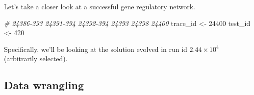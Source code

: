 \documentclass[
]{book}
\newenvironment{Shaded}{\begin{snugshade}}{\end{snugshade}}
\newcommand{\CommentTok}[1]{\textcolor[rgb]{0.56,0.35,0.01}{\textit{#1}}}
\newcommand{\DecValTok}[1]{\textcolor[rgb]{0.00,0.00,0.81}{#1}}
\newcommand{\NormalTok}[1]{#1}
\newcommand{\OtherTok}[1]{\textcolor[rgb]{0.56,0.35,0.01}{#1}}
\begin{document}
Let's take a closer look at a successful gene regulatory network.

\begin{Shaded}
\begin{Highlighting}[]
\CommentTok{\# 24386{-}393 24391{-}394 24392{-}394 24393 24398 24400}
\NormalTok{trace\_id }\OtherTok{\textless{}{-}} \DecValTok{24400}
\NormalTok{test\_id }\OtherTok{\textless{}{-}} \DecValTok{420}
\end{Highlighting}
\end{Shaded}

Specifically, we'll be looking at the solution evolved in run id \ensuremath{2.44\times 10^{4}} (arbitrarily selected).

\hypertarget{data-wrangling-1}{%
\subsection{Data wrangling}\label{data-wrangling-1}}
\end{document}
